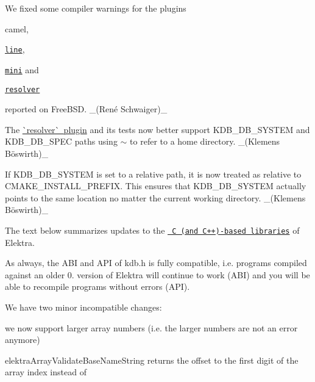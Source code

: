 \begin{DoxyItemize}
\item We fixed some compiler warnings for the plugins
\begin{DoxyItemize}
\item {\ttfamily camel},
\item \href{https://www.libelektra.org/plugins/line}{\texttt{ {\ttfamily line}}},
\item \href{https://www.libelektra.org/plugins/mini}{\texttt{ {\ttfamily mini}}} and
\item \href{https://www.libelektra.org/plugins/resolver}{\texttt{ {\ttfamily resolver}}}
\end{DoxyItemize}

reported on Free\+B\+SD. \+\_\+(René Schwaiger)\+\_\+
\item The \mbox{\hyperlink{autotoc_md618_src_plugins_resolver_README_md}{\`{}resolver\`{} plugin}} and its tests now better support {\ttfamily K\+D\+B\+\_\+\+D\+B\+\_\+\+S\+Y\+S\+T\+EM} and {\ttfamily K\+D\+B\+\_\+\+D\+B\+\_\+\+S\+P\+EC} paths using {\ttfamily $\sim$} to refer to a home directory. \+\_\+(Klemens Böswirth)\+\_\+
\item If {\ttfamily K\+D\+B\+\_\+\+D\+B\+\_\+\+S\+Y\+S\+T\+EM} is set to a relative path, it is now treated as relative to {\ttfamily C\+M\+A\+K\+E\+\_\+\+I\+N\+S\+T\+A\+L\+L\+\_\+\+P\+R\+E\+F\+IX}. This ensures that {\ttfamily K\+D\+B\+\_\+\+D\+B\+\_\+\+S\+Y\+S\+T\+EM} actually points to the same location no matter the current working directory. \+\_\+(Klemens Böswirth)\+\_\+
\end{DoxyItemize}

The text below summarizes updates to the \href{https://www.libelektra.org/libraries/readme}{\texttt{ C (and C++)-\/based libraries}} of Elektra.

As always, the A\+BI and A\+PI of kdb.\+h is fully compatible, i.\+e. programs compiled against an older 0. version of Elektra will continue to work (A\+BI) and you will be able to recompile programs without errors (A\+PI).

We have two minor incompatible changes\+:


\begin{DoxyItemize}
\item we now support larger array numbers (i.\+e. the larger numbers are not an error anymore)
\item {\ttfamily elektra\+Array\+Validate\+Base\+Name\+String} returns the offset to the first digit of the array index instead of {}
\end{DoxyItemize}

